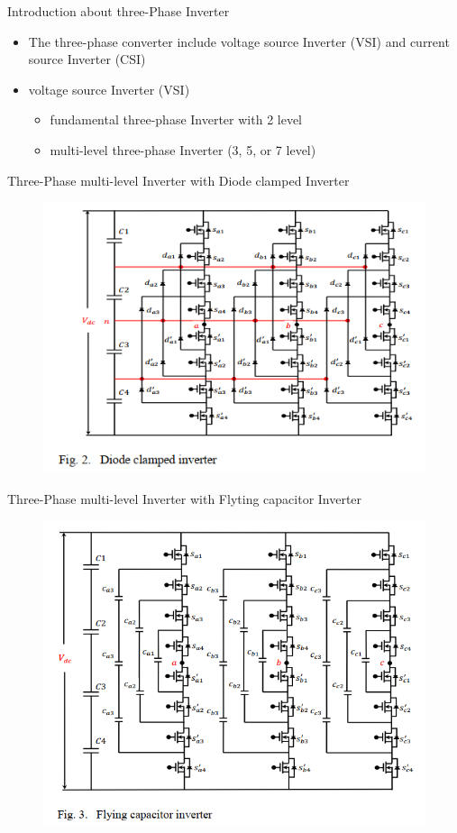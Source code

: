 \documentclass[
	11pt, %
]{beamer}
\begin{document}
\begin{frame}{Introduction about three-Phase Inverter}
	\begin{itemize}
		\item {The three-phase converter include voltage source Inverter (VSI) and current source Inverter (CSI)}
		\item {voltage source Inverter (VSI)}
		\begin{itemize}
			\item {fundamental three-phase Inverter with 2 level}
			\item {multi-level three-phase Inverter (3, 5, or 7 level)}
		\end{itemize}
	\end{itemize}
\end{frame}

\begin{frame}{Three-Phase multi-level Inverter with Diode clamped Inverter}
	\begin{figure}
		\includegraphics[width=0.7\linewidth]{diodeClamped.png}
	\end{figure}
\end{frame}

\begin{frame}{Three-Phase multi-level Inverter with Flyting capacitor Inverter}
	\begin{figure}
		\includegraphics[width=0.6\linewidth]{flyingcap.png}
	\end{figure}
\end{frame}
\end{document}
